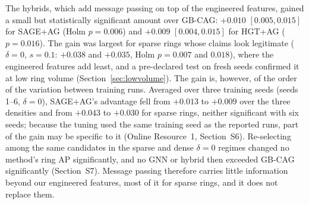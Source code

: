 \documentclass[pdflatex,sn-vancouver-num]{sn-jnl}
\newcommand{\SSecSeeds}{S6}\newcommand{\STabSeeds}{S5}
\newcommand{\SSecRegime}{S7}\newcommand{\STabRegime}{S6}
\begin{document}
The hybrids, which add message passing on top of the engineered features,
gained a small but statistically significant amount over GB-CAG: $+0.010$
$[0.005, 0.015]$ for SAGE+AG (Holm $p=0.006$) and $+0.009$ $[0.004, 0.015]$
for HGT+AG ($p=0.016$). The gain was largest for sparse rings whose claims
look legitimate ($\delta=0$, $s=0.1$: $+0.038$ and $+0.035$, Holm $p=0.007$
and $0.018$), where the engineered features add least, and a pre-declared
test on fresh seeds confirmed it at low ring volume
(Section~\ref{sec:lowvolume}). The gain is, however, of the order of the
variation between training runs. Averaged over three training seeds (seeds
1--6, $\delta=0$), SAGE+AG's advantage fell from $+0.013$ to $+0.009$ over
the three densities and from $+0.043$ to $+0.030$ for sparse rings, neither
significant with six seeds; because the tuning used the same training seed as
the reported runs, part of the gain may be specific to it (Online
Resource~1, Section~\SSecSeeds). Re-selecting among the same candidates in the
sparse and dense $\delta=0$ regimes changed no method's ring AP significantly, and no GNN
or hybrid then exceeded GB-CAG significantly (Section~\SSecRegime). Message
passing therefore carries little information beyond our engineered features,
most of it for sparse rings, and it does not replace them.
\end{document}

